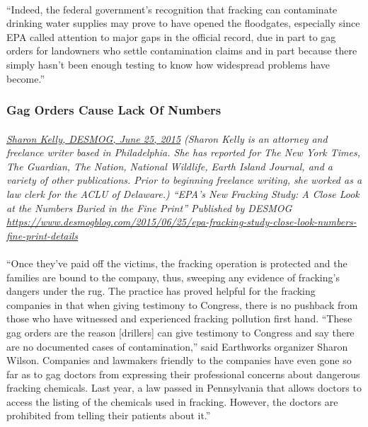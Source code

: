 \documentclass{article}
\begin{document}
\paragraph{}
``Indeed, the federal government’s recognition that fracking can contaminate drinking water supplies may prove to have opened the floodgates, especially since EPA called attention to major gaps in the official record, due in part to gag orders for landowners who settle contamination claims and in part because there simply hasn’t been enough testing to know how widespread problems have become.”

\subsubsection{Gag Orders Cause Lack Of Numbers}
\paragraph{}
\small
\textit{
\underline{Sharon Kelly, DESMOG,  June 25, 2015}
(Sharon Kelly is an attorney and freelance writer based in Philadelphia. She has reported for The New York Times, The Guardian, The Nation, National Wildlife, Earth Island Journal, and a variety of other publications. Prior to beginning freelance writing, she worked as a law clerk for the ACLU of Delaware.) “EPA's New Fracking Study: A Close Look at the Numbers Buried in the Fine Print” Published by DESMOG  
\url{https://www.desmogblog.com/2015/06/25/epa-fracking-study-close-look-numbers-fine-print-details}}
\normalsize

\paragraph{}
``Once they’ve paid off the victims, the fracking operation is protected and the families are bound to the company, thus, sweeping any evidence of fracking’s dangers under the rug. The practice has proved helpful for the fracking companies in that when giving testimony to Congress, there is no pushback from those who have witnessed and experienced fracking pollution first hand.     “These gag orders are the reason [drillers] can give testimony to Congress and say there are no documented cases of contamination,” said Earthworks organizer Sharon Wilson.  Companies and lawmakers friendly to the companies have even gone so far as to gag doctors from expressing their professional concerns about dangerous fracking chemicals. Last year, a law passed in Pennsylvania that allows doctors to access the listing of the chemicals used in fracking. However, the doctors are prohibited from telling their patients about it.”
\end{document}
